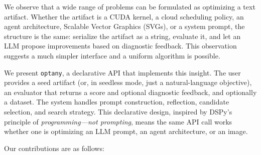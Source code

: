 \documentclass[sigconf,anonymous,review]{acmart}
\newcommand{\oa}{\texttt{optany}}
\begin{document}
We observe that a wide range of problems can be formulated as optimizing a text artifact. Whether the artifact is a CUDA kernel, a cloud scheduling policy, an agent architecture, Scalable Vector Graphics (SVGs), or a system prompt, the structure is the same: serialize the artifact as a string, evaluate it, and let an LLM propose improvements based on diagnostic feedback. This observation suggests a much simpler interface and a uniform algorithm is possible.

We present \oa{}, a declarative API that implements this insight. The user provides a seed artifact (or, in seedless mode, just a natural-language objective), an evaluator that returns a score and optional diagnostic feedback, and optionally a dataset. The system handles prompt construction, reflection, candidate selection, and search strategy. This declarative design, inspired by DSPy's~\cite{khattab2023dspy} principle of \emph{programming---not prompting}, means the same API call works whether one is optimizing an LLM prompt, an agent architecture, or an image.

Our contributions are as follows:
\end{document}
